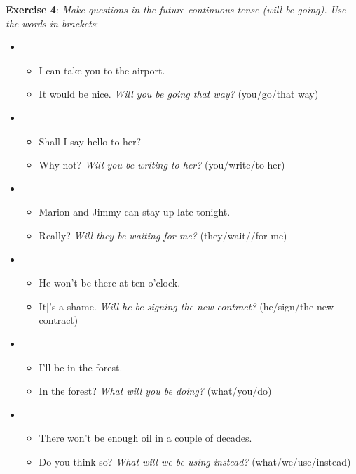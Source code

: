 \textbf{Exercise 4}: \textit{Make questions in the future continuous tense (will be going). Use the words in brackets}:

\begin{itemize}

\item
\begin{itemize}
\item I can take you to the airport.
\item It would be nice. \textit{Will you be going that way?} (you/go/that way)
\end{itemize}

\item
\begin{itemize}
\item Shall I say hello to her?
\item Why not? \textit{Will you be writing to her?} (you/write/to her)
\end{itemize}

\item
\begin{itemize}
\item Marion and Jimmy can stay up late tonight.
\item Really? \textit{Will they be waiting for me?} (they/wait//for me)
\end{itemize}

\item
\begin{itemize}
\item He won't be there at ten o'clock.
\item It|'s a shame. \textit{Will he be signing the new contract?} (he/sign/the new contract)
\end{itemize}

\item
\begin{itemize}
\item I'll be in the forest.
\item In the forest? \textit{What will you be doing?} (what/you/do)
\end{itemize}

\item
\begin{itemize}
\item There won't be enough oil in a couple of decades.
\item Do you think so? \textit{What will we be using instead?} (what/we/use/instead)
\end{itemize}


\end{itemize}
